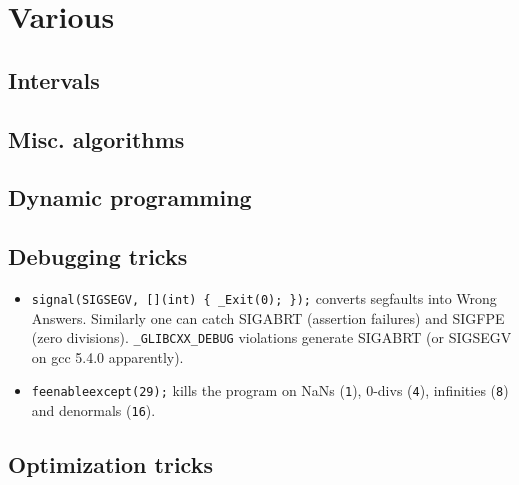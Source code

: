 \chapter{Various}

\section{Intervals}

\section{Misc. algorithms}

\section{Dynamic programming}


\section{Debugging tricks}
	\begin{itemize}
		\item \texttt{signal(SIGSEGV, [](int) \{ \_Exit(0); \});} converts segfaults into Wrong Answers.
			Similarly one can catch SIGABRT (assertion failures) and SIGFPE (zero divisions).
			\texttt{\_GLIBCXX\_DEBUG} violations generate SIGABRT (or SIGSEGV on gcc 5.4.0 apparently).
		\item \texttt{feenableexcept(29);} kills the program on NaNs (\texttt 1), 0-divs (\texttt 4), infinities (\texttt 8) and denormals (\texttt{16}).
	\end{itemize}

\section{Optimization tricks}
